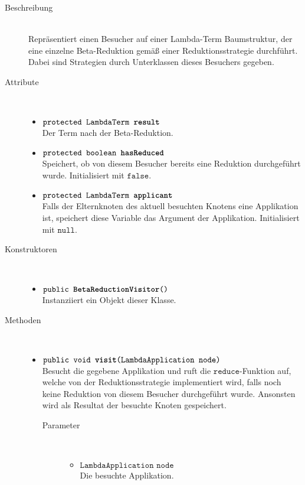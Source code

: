 \begin{description}
\item[Beschreibung] \hfill \\ Repräsentiert einen Besucher auf einer Lambda-Term Baumstruktur, der eine einzelne Beta-Reduktion gemäß einer Reduktionsstrategie durchführt. Dabei sind Strategien durch Unterklassen dieses Besuchers gegeben.

\item[Attribute] \hfill \\
	\vspace{-.8cm}
	\begin{itemize}
		\item $\texttt{protected LambdaTerm \textbf{result}}$ \\ Der Term nach der Beta-Reduktion.
		\item $\texttt{protected boolean \textbf{hasReduced}}$ \\ Speichert, ob von diesem Besucher bereits eine Reduktion durchgeführt wurde. Initialisiert mit $\texttt{false}$.
		\item $\texttt{protected LambdaTerm \textbf{applicant}}$ \\ Falls der Elternknoten des aktuell besuchten Knotens eine Applikation ist, speichert diese Variable das Argument der Applikation. Initialisiert mit $\texttt{null}$.
	\end{itemize}

\item[Konstruktoren] \hfill \\
	\vspace{-.8cm}
	\begin{itemize}
		\item $\texttt{public \textbf{BetaReductionVisitor}()}$ \\ Instanziiert ein Objekt dieser Klasse.
	\end{itemize}

\item[Methoden] \hfill \\
	\vspace{-.8cm}
	\begin{itemize}
		\item $\texttt{public void \textbf{visit}(LambdaApplication node)}$ \\ Besucht die gegebene Applikation und ruft die $\texttt{reduce}$-Funktion auf, welche von der Reduktionsstrategie implementiert wird, falls noch keine Reduktion von diesem Besucher durchgeführt wurde. Ansonsten wird als Resultat der besuchte Knoten gespeichert.
		\begin{description}
			\item[Parameter] \hfill \\
			\vspace{-.8cm}
			\begin{itemize}
				\item $\texttt{LambdaApplication node}$ \\ Die besuchte Applikation.
			\end{itemize}
		\end{description}
		

\end{itemize}
\end{description}
